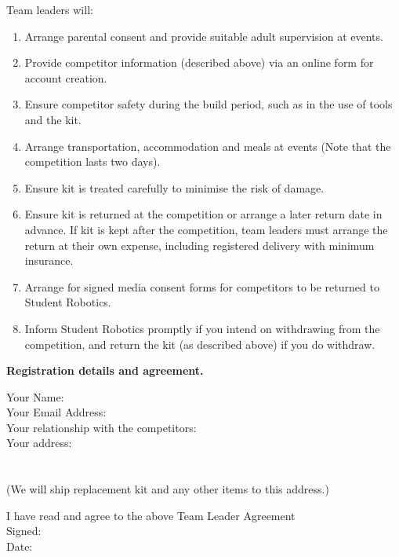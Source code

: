 \documentclass[a4paper, 11pt]{scrartcl}
\begin{document}
Team leaders will:

\begin{enumerate}
\item Arrange parental consent and provide suitable adult supervision at
events.

\item Provide competitor information (described above) via an online form for
account creation.

\item Ensure competitor safety during the build period, such as in the use of
tools and the kit.

\item Arrange transportation, accommodation and meals at events (Note that
the competition lasts two days).

\item Ensure kit is treated carefully to minimise the risk of damage.

\item Ensure kit is returned at the competition or arrange a later return
date in advance.  If kit is kept after the competition, team leaders must
arrange the return at their own expense, including registered delivery with
minimum  insurance.

\item Arrange for signed media consent forms for competitors to be returned
to Student Robotics.

\item Inform Student Robotics promptly if you intend on withdrawing from the
competition, and return the kit (as described above) if you do withdraw.

\end{enumerate}

\newpage

\textbf{Registration details and agreement.}

\vspace{20pt}
\doublespacing
\noindent
Your Name:\hrulefill\\
Your Email Address:\hrulefill\\
Your relationship with the competitors:\hrulefill\\
Your address:\hrulefill\\
\hbox{}\hrulefill\\
\hbox{}\hrulefill\\
(We will ship replacement kit and any other items to this address.)

\noindent
\dotfill\hfill

\noindent
I have read and agree to the above Team Leader Agreement\\
Signed:\hrulefill\\
Date:\hrulefill\\

\singlespacing
\end{document}
